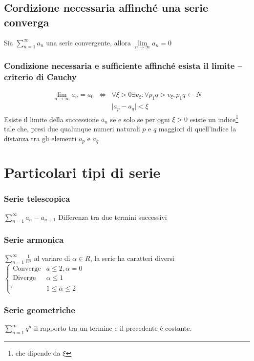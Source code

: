 \documentclass{book}
\newcommand{\abs}[1]{\lvert#1\rvert}
\begin{document}
\subsection{Cordizione necessaria affinché una serie converga}
Sia $\displaystyle\sum_{n=1}^{\infty}a_n$ una serie convergente, allora
$\lim\limits_{n\to\infty}a_n=0$
\subsubsection{Condizione necessaria e sufficiente affinché esista il limite --
criterio di Cauchy}
\begin{eqnarray*}
	\lim_{n\to \infty} a_n=a_0 &\Leftrightarrow & \forall \xi >0 \exists v_\xi
	: \forall p_1q>v_\xi, p_1q\leftarrow N \\
	&& \abs{a_p-a_q}<\xi
\end{eqnarray*}
Esiste il limite della successione $a_n$ se e solo se per ogni $\xi >0$ esiste
un indice\footnote{che dipende da $\xi$} tale che, presi due qualunque numeri
naturali $p$ e $q$ maggiori di quell'indice la distanza tra gli elementi $a_p$
e $a_q$
\section{Particolari tipi di serie}
\subsubsection{Serie telescopica}
$\displaystyle\sum_{n=1}^{\infty}a_n-a_{n+1}$ Differenza tra due termini
successivi
\subsubsection{Serie armonica}
$\displaystyle\sum_{n=1}^{\infty}\frac{1}{n^\alpha}$ al variare di 
$\alpha \in R$, la serie ha caratteri diversi $\begin{cases}
	\text{Converge} & a\leq 2, \alpha=0\\
	\text{Diverge} &\alpha \leq 1\\
	\not{} &1\leq \alpha \leq 2
\end{cases}$
\subsubsection{Serie geometriche}
$\displaystyle\sum_{n=1}^{\infty}q^n$ il rapporto tra un termine e il
precedente è costante.
\end{document}
